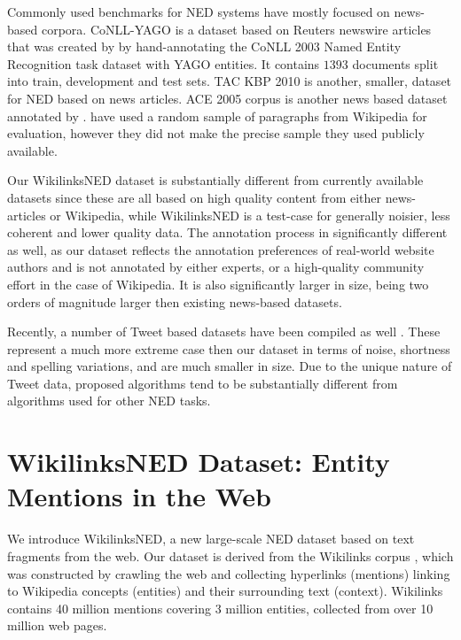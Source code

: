 \documentclass[11pt]{article}
\begin{document}
	Commonly used benchmarks for NED systems have mostly focused on news-based corpora. CoNLL-YAGO is a dataset based on Reuters newswire articles that was created by  by hand-annotating the CoNLL 2003 Named Entity Recognition task dataset with YAGO entities. It contains $1393$ documents split into train, development and test sets. TAC KBP 2010 \cite{ji2010overview} is another, smaller, dataset for NED based on news articles. ACE 2005 corpus is another news based dataset annotated by .  have used a random sample of paragraphs from Wikipedia for evaluation, however they did not make the precise sample they used publicly available. 
	
	Our WikilinksNED dataset is substantially different from currently available datasets since these are all based on high quality content from either news-articles or Wikipedia, while WikilinksNED is a test-case for generally noisier, less coherent and lower quality data. The annotation process in significantly different as well, as our dataset reflects the annotation preferences of real-world website authors and is not annotated by either experts, or a high-quality community effort in the case of Wikipedia. It is also significantly larger in size, being two orders of magnitude larger then existing news-based datasets.
	
	Recently, a number of Tweet based datasets have been compiled as well \cite{fromreide2014crowdsourcing}. These represent a much more extreme case then our dataset in terms of noise, shortness and spelling variations, and are much smaller in size. Due to the unique nature of Tweet data, proposed algorithms tend to be substantially different from algorithms used for other NED tasks.
	
	\section{WikilinksNED Dataset: Entity Mentions in the Web}
	\label{sec:w}
	
	We introduce WikilinksNED, a new large-scale NED dataset based on text fragments from the web. Our dataset is derived from the Wikilinks corpus \cite{singh12:wiki-links}, which was constructed by crawling the web and collecting hyperlinks (mentions) linking to Wikipedia concepts (entities) and their surrounding text (context). Wikilinks contains 40 million mentions covering 3 million entities, collected from over 10 million web pages. 
	
\end{document}
